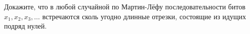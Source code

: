 Докажите, что в любой случайной по Мартин-Лёфу последовательности битов $x_1, x_2, x_3, \dots$
встречаются сколь угодно длинные отрезки, состоящие из идущих подряд нулей.
